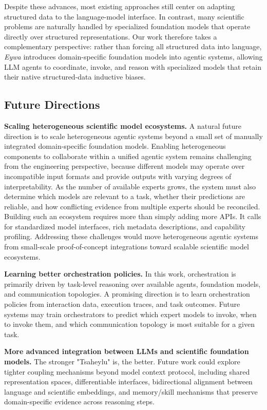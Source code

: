 Despite these advances, most existing approaches still center on adapting structured data to the language-model interface. In contrast, many scientific problems are naturally handled by specialized foundation models that operate directly over structured representations. Our work therefore takes a complementary perspective: rather than forcing all structured data into language, \textit{Eywa} introduces domain-specific foundation models into agentic systems, allowing LLM agents to coordinate, invoke, and reason with specialized models that retain their native structured-data inductive biases.


\subsection{Future Directions}

\textbf{Scaling heterogeneous scientific model ecosystems.}
A natural future direction is to scale heterogeneous agentic systems beyond a small set of manually integrated domain-specific foundation models. Enabling heterogeneous components to collaborate within a unified agentic system remains challenging from the engineering perspective, because different models may operate over incompatible input formats and provide outputs with varying degrees of interpretability. As the number of available experts grows, the system must also determine which models are relevant to a task, whether their predictions are reliable, and how conflicting evidence from multiple experts should be reconciled.
Building such an ecosystem requires more than simply adding more APIs. It calls for standardized model interfaces, rich metadata descriptions, and capability profiling. Addressing these challenges would move heterogeneous agentic systems from small-scale proof-of-concept integrations toward scalable scientific model ecosystems.

\textbf{Learning better orchestration policies.}
In this work, orchestration is primarily driven by task-level reasoning over available agents, foundation models, and communication topologies. A promising direction is to learn orchestration policies from interaction data, execution traces, and task outcomes. Future systems may train orchestrators to predict which expert models to invoke, when to invoke them, and which communication topology is most suitable for a given task.

\textbf{More advanced integration between LLMs and scientific foundation models.}
The stronger "Tsaheylu" is, the better. Future work could explore tighter coupling mechanisms beyond model context protocol, including shared representation spaces, differentiable interfaces, bidirectional alignment between language and scientific embeddings, and memory/skill mechanisms that preserve domain-specific evidence across reasoning steps.


